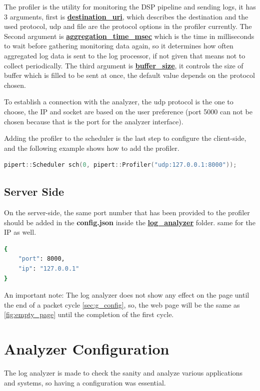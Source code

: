 The profiler is the utility for monitoring the DSP pipeline and sending logs,
it has 3 arguments, first is \textbf{\url{destination_uri}},
which describes the destination and the used protocol, udp and file
are the protocol options in the profiler currently. The Second argument
is \textbf{\url{aggregation_time_msec}} which is the time in milliseconds to wait 
before gathering monitoring data again, so it determines how often aggregated
log data is sent to the log processor, if not given that means not to collect
periodically. The third argument is \textbf{\url{buffer_size}}, it controls the size
of buffer which is filled to be sent at once, the default value depends on the
protocol chosen.

To establish a connection with the analyzer, the udp protocol
is the one to choose, the IP and socket are based on the user
preference (port 5000 can not be chosen because that is the port
for the analyzer interface).

Adding the profiler to the scheduler is the last step to configure
the client-side, and the following example shows how to add the profiler.
\newline
\begin{lstlisting}[language=c++, caption={Adding the profiler},captionpos=b]
	pipert::Scheduler sch(0, pipert::Profiler("udp:127.0.0.1:8000"));
\end{lstlisting}

\subsection{Server Side}\label{client_side}
On the server-side, the same port number that has been provided to the profiler
should be added in the \textbf{config.json} inside the \textbf{\url{log_analyzer}} folder. same for
the IP as well.
\newline
\begin{lstlisting}[language=bash, caption={connection configuration},captionpos=b]
{
    "port": 8000,
    "ip": "127.0.0.1"
}
\end{lstlisting}

An important note: The log analyzer does not show any effect on the page until the end of a packet cycle
\ref{sec:g_config}, so, the web page will be the same as \ref{fig:empty_page} 
until the completion of the first cycle.

\section{Analyzer Configuration}
The log analyzer is made to check the sanity and analyze various
applications and systems, so having a configuration was essential.

